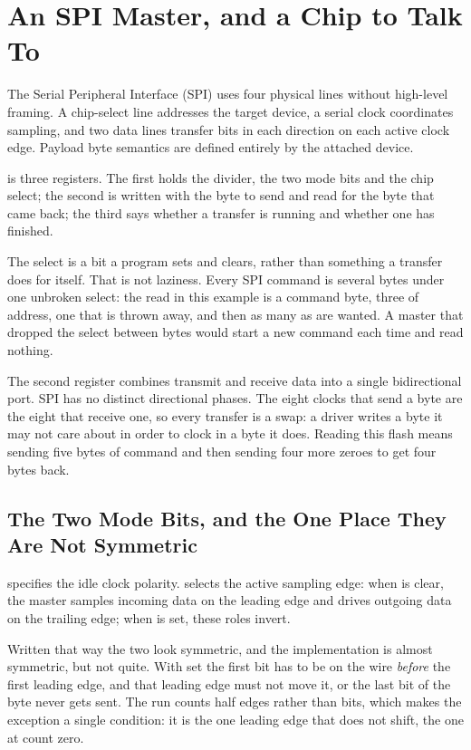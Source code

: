 \section{An SPI Master, and a Chip to Talk To}
\label{sec:x-spi}

The Serial Peripheral Interface (SPI) uses four physical lines
without high-level framing. A chip-select line addresses the target
device, a serial clock coordinates sampling, and two data lines
transfer bits in each direction on each active clock edge. Payload
byte semantics are defined entirely by the attached device.

 is three registers. The first holds the divider, the two
mode bits and the chip select; the second is written with the byte to
send and read for the byte that came back; the third says whether a
transfer is running and whether one has finished.

The select is a bit a program sets and clears, rather than something a
transfer does for itself. That is not laziness. Every SPI command is
several bytes under one unbroken select: the read in this example is a
command byte, three of address, one that is thrown away, and then as
many as are wanted. A master that dropped the select between bytes
would start a new command each time and read nothing.

The second register combines transmit and receive data into a single
bidirectional port. SPI has no distinct directional phases. The
eight clocks that send a byte are the eight that receive one, so
every transfer is a swap: a driver writes a byte it may not care about
in order to clock in a byte it does. Reading this flash means sending
five bytes of command and then sending four more zeroes to get four
bytes back.

\subsection{The Two Mode Bits, and the One Place They Are Not Symmetric}

 specifies the idle clock polarity.  selects the
active sampling edge: when  is clear, the master samples
incoming data on the leading edge and drives outgoing data on the trailing
edge; when  is set, these roles invert.

Written that way the two look symmetric, and the implementation is
almost symmetric, but not quite. With  set the first bit
has to be on the wire \emph{before} the first leading edge, and that
leading edge must not move it, or the last bit of the byte never gets
sent. The run counts half edges rather than bits, which makes the
exception a single condition: it is the one leading edge that does not
shift, the one at count zero.


